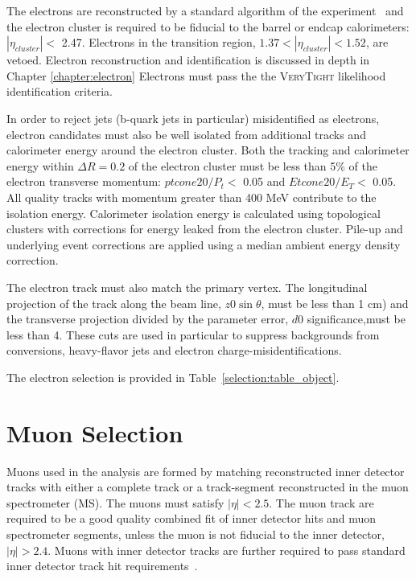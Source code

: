The electrons are reconstructed by a standard algorithm of the
experiment~\cite{ATLAS-CONF-2014-032} and the electron cluster is required to be fiducial 
to the barrel or endcap calorimeters: $|\eta_{cluster}| < $ 2.47. Electrons
in the transition region, $1.37 < |\eta_{cluster}| < 1.52$, are vetoed.
Electron reconstruction and identification is discussed in depth in Chapter \ref{chapter:electron}
Electrons must pass the the \textsc{VeryTight} likelihood identification criteria.

In order to reject jets (b-quark jets in particular) misidentified as electrons,
electron candidates  must also be well isolated from additional tracks and
calorimeter energy around the electron cluster. Both the tracking 
and calorimeter energy within $\Delta R=0.2$ of the electron
cluster must be less than 5\% of the electron transverse momentum: $ptcone20/P_t <$ 0.05 and $Etcone20/E_T <$ 0.05.
All quality tracks with momentum greater than 400 MeV contribute to the isolation
energy.  Calorimeter isolation energy is calculated
using topological clusters with corrections for energy leaked from the
electron cluster. Pile-up and underlying event corrections are applied using
a median ambient energy density correction.  

The electron track must also match the primary vertex. The longitudinal projection 
of the track along the beam line, $z0\sin{\theta}$, must be less than 1 cm) and the transverse projection divided by the
parameter error, $d0$ significance,must be less than 4. These cuts are used in particular to suppress backgrounds
from conversions, heavy-flavor jets and electron charge-misidentifications. 


The electron selection is provided in Table~\ref{selection:table_object}. 


\section{Muon Selection}

Muons used in the analysis are formed by matching reconstructed inner detector
tracks with either a complete track or a track-segment reconstructed in the muon spectrometer (MS).
The muons must satisfy $|\eta| < 2.5$.
The muon track are required to be a good quality combined fit of inner detector hits and muon
spectrometer segments, unless the muon is not fiducial to the
inner detector, $|\eta| > 2.4$.  Muons with inner detector tracks are further required
to pass standard inner detector track hit requirements~\cite{MCP2012}.  

